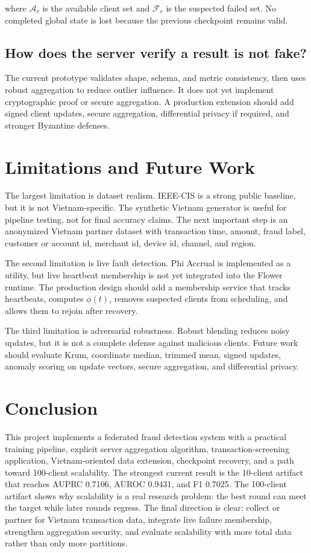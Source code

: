 \documentclass[conference]{IEEEtran}
\begin{document}
where \(\mathcal{A}_r\) is the available client set and \(\mathcal{F}_r\) is
the suspected failed set. No completed global state is lost because the previous
checkpoint remains valid.

\subsection{How does the server verify a result is not fake?}

The current prototype validates shape, schema, and metric consistency, then
uses robust aggregation to reduce outlier influence. It does not yet implement
cryptographic proof or secure aggregation. A production extension should add
signed client updates, secure aggregation, differential privacy if required,
and stronger Byzantine defenses.

\section{Limitations and Future Work}

The largest limitation is dataset realism. IEEE-CIS is a strong public baseline,
but it is not Vietnam-specific. The synthetic Vietnam generator is useful for
pipeline testing, not for final accuracy claims. The next important step is an
anonymized Vietnam partner dataset with transaction time, amount, fraud label,
customer or account id, merchant id, device id, channel, and region.

The second limitation is live fault detection. Phi Accrual is implemented as a
utility, but live heartbeat membership is not yet integrated into the Flower
runtime. The production design should add a membership service that tracks
heartbeats, computes \(\phi(t)\), removes suspected clients from scheduling,
and allows them to rejoin after recovery.

The third limitation is adversarial robustness. Robust blending reduces noisy
updates, but it is not a complete defense against malicious clients. Future work
should evaluate Krum, coordinate median, trimmed mean, signed updates, anomaly
scoring on update vectors, secure aggregation, and differential privacy.

\section{Conclusion}

This project implements a federated fraud detection system with a practical
training pipeline, explicit server aggregation algorithm, transaction-screening
application, Vietnam-oriented data extension, checkpoint recovery, and a path
toward 100-client scalability. The strongest current result is the 10-client
artifact that reaches AUPRC 0.7106, AUROC 0.9431, and F1 0.7025. The 100-client
artifact shows why scalability is a real research problem: the best round can
meet the target while later rounds regress. The final direction is clear:
collect or partner for Vietnam transaction data, integrate live failure
membership, strengthen aggregation security, and evaluate scalability with more
total data rather than only more partitions.
\end{document}
